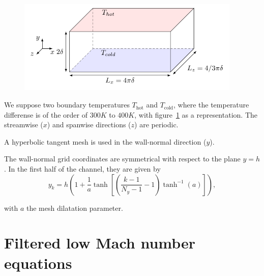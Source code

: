 \begin{figure}
  \begin{center}
    \includegraphics[width=0.95\textwidth]{./figures/canal_plan.pdf}
  \end{center}
  \caption{}
  \label{figure:canal_plan_anisotherme}
\end{figure}


We suppose two boundary temperatures $T_{\text{hot}}$ and $T_{\text{cold}}$, where the temperature differense is of the order of $300K$ to $400K$, with figure~\ref{figure:canal_plan_anisotherme} as a representation.
The streamwise ($x$) and spanwise directions ($z$) are periodic.

A hyperbolic tangent mesh is used in the wall-normal direction ($y$).

The wall-normal grid coordinates are symmetrical with respect to the plane $y=h$. In the first half of the channel, they are given by
\begin{equation}
y_k = h \left( 1 + \frac{1}{a} \tanh\left[ \left(\frac{k-1}{N_y-1} - 1\right)\tanh^{-1}(a)\right] \right), \label{eqmesh}
\end{equation}

with $a$ the mesh dilatation parameter.

\section{Filtered low Mach number equations}\label{label-pa}

